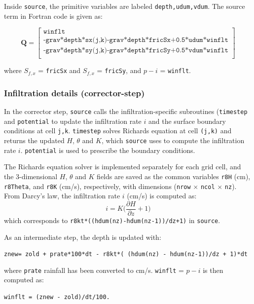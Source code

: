 \documentclass{article}
\newcommand{\code}[1]{\texttt{#1}}
\begin{document}
Inside \code{source}, the primitive variables are labeled \code{depth,udum,vdum}. 
The source term in Fortran code is given as:

\[ \mathbf{Q} = 
 \begin{bmatrix}
	\code{winflt}  \\[.1cm]
	\code{-grav*depth*sx(j,k)-grav*depth*fricSx+0.5*udum*winflt}\\[.1cm]
	\code{-grav*depth*sy(j,k)-grav*depth*fricSy+0.5*vdum*winflt}\\[.1cm]
\end{bmatrix} 
\]

where $S_{f,x}$ = \code{fricSx} and  $S_{f,x}$ = \code{fricSy}, and $p-i$ = \code{winflt}.


\subsubsection*{Infiltration details (corrector-step)}

In the corrector step, \code{source} calls the infiltration-specific subroutines (\code{timestep} and \code{potential} to update the infiltration rate $i$ and the surface boundary conditions at cell \code{j,k}. 
\code{timestep} solves Richards equation at cell \code{(j,k)} and returns the updated $H$, $\theta$ and $K$, which \code{source} uses to compute the infiltration rate $i$. \code{potential} is used to prescribe the boundary conditions. 

 The Richards equation solver is implemented separately for each grid cell, and the 3-dimensional $H$, $\theta$ and $K$  fields are saved as the common variables \code{r8H} (cm), \code{r8Theta}, and  \code{r8K} (cm/s), respectively, with dimensions (\code{nrow} $\times$ \code{ncol} $\times$ \code{nz}).\\ 


\noindent From Darcy's law, the infiltration rate $i$ (cm/s) is computed as:
$$ i =  K \bigg(\frac{\partial H}{\partial z} + 1\bigg ) $$
which corresponds to \code{r8kt*((hdum(nz)-hdum(nz-1))/dz+1)} in \code{source}.

\noindent  As an intermediate step, the depth is updated with: \\
\begin{center}
\code{znew=  zold + prate*100*dt - r8kt*( (hdum(nz) - hdum(nz-1))/dz + 1)*dt } 	
\end{center}
where \code{prate}  rainfall has been converted to cm/s.
 \code{winflt} = $p-i$  is then computed as:
\begin{center}
 \code{winflt = (znew - zold)/dt/100.} 	
\end{center}
\end{document}
